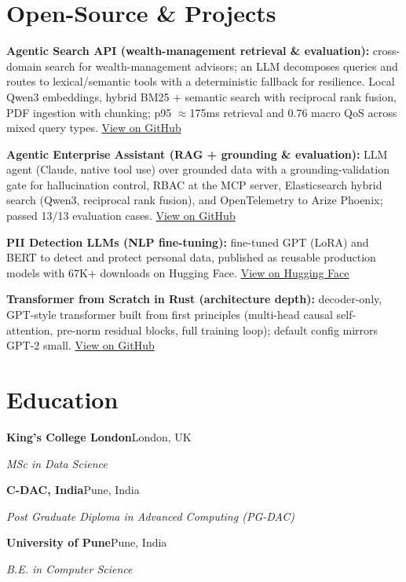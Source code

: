\documentclass[10pt,a4paper]{article}
\begin{document}
\section{Open-Source \& Projects}
\begin{tight}
  \item \textbf{Agentic Search API (wealth-management retrieval \& evaluation):} cross-domain search for wealth-management advisors; an LLM decomposes queries and routes to lexical/semantic tools with a deterministic fallback for resilience. Local Qwen3 embeddings, hybrid BM25 + semantic search with reciprocal rank fusion, PDF ingestion with chunking; p95 $\approx$175ms retrieval and 0.76 macro QoS across mixed query types. \href{https://github.com/abhijeetscode/search-agent}{View on GitHub}
  \item \textbf{Agentic Enterprise Assistant (RAG + grounding \& evaluation):} LLM agent (Claude, native tool use) over grounded data with a grounding-validation gate for hallucination control, RBAC at the MCP server, Elasticsearch hybrid search (Qwen3, reciprocal rank fusion), and OpenTelemetry to Arize Phoenix; passed 13/13 evaluation cases. \href{https://github.com/abhijeetscode/Agentic-Enterprise-Assistant}{View on GitHub}
  \item \textbf{PII Detection LLMs (NLP fine-tuning):} fine-tuned GPT (LoRA) and BERT to detect and protect personal data, published as reusable production models with 67K+ downloads on Hugging Face. \href{https://huggingface.co/ab-ai/pii_model}{View on Hugging Face}
  \item \textbf{Transformer from Scratch in Rust (architecture depth):} decoder-only, GPT-style transformer built from first principles (multi-head causal self-attention, pre-norm residual blocks, full training loop); default config mirrors GPT-2 small. \href{https://github.com/abhijeetscode/transformer-rust}{View on GitHub}
\end{tight}

\section{Education}
{\color{company}\bfseries King's College London}\hfill {\color{muted}London, UK}\par
{\itshape MSc in Data Science}\par\vspace{2pt}
{\color{company}\bfseries C-DAC, India}\hfill {\color{muted}Pune, India}\par
{\itshape Post Graduate Diploma in Advanced Computing (PG-DAC)}\par\vspace{2pt}
{\color{company}\bfseries University of Pune}\hfill {\color{muted}Pune, India}\par
{\itshape B.E. in Computer Science}\par
\end{document}
